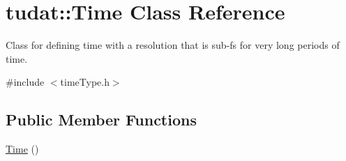 \hypertarget{classtudat_1_1Time}{}\section{tudat\+:\+:Time Class Reference}
\label{classtudat_1_1Time}


Class for defining time with a resolution that is sub-\/fs for very long periods of time.  




{\ttfamily \#include $<$time\+Type.\+h$>$}

\subsection*{Public Member Functions}
\begin{DoxyCompactItemize}
\item 
\hyperlink{classtudat_1_1Time_a0c0c014c20da523f9654b5dcf6be11b4}{Time} ()\hypertarget{classtudat_1_1Time_a0c0c014c20da523f9654b5dcf6be11b4}{}\label{classtudat_1_1Time_a0c0c014c20da523f9654b5dcf6be11b4}


\end{DoxyCompactItemize}
